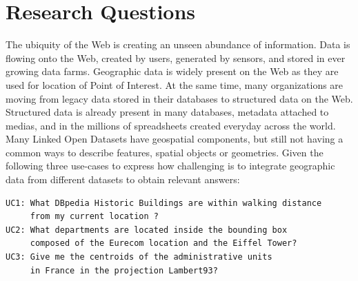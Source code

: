\begin{enumerate}
\begin{figure}[ht!]
\end{figure}



\section{Research Questions}
\label{sec:questions}
 

The ubiquity of the Web is creating an unseen abundance of information. Data is flowing onto the Web, created by users, generated by sensors, and stored in ever growing data farms. Geographic data is widely present on the Web as they are used for location of Point of Interest. At the same time, many organizations are moving from legacy data stored in their databases to structured data on the Web. Structured data is already present in many databases, metadata attached to medias, and in the millions of spreadsheets created everyday across the world. 
Many Linked Open Datasets have geospatial components, but still not having a common ways to describe features, spatial objects or geometries. Given the following three use-cases to express how challenging is to integrate geographic data from different datasets to obtain relevant answers: 
\begin{verbatim}
UC1: What DBpedia Historic Buildings are within walking distance 
     from my current location ?
UC2: What departments are located inside the bounding box 
     composed of the Eurecom location and the Eiffel Tower? 
UC3: Give me the centroids of the administrative units 
     in France in the projection Lambert93?


\end{verbatim}
\end{enumerate}
